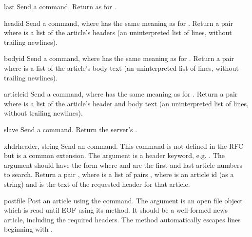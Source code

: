 \begin{funcdesc}{last}{}
Send a  command.  Return as for .
\end{funcdesc}

\begin{funcdesc}{head}{id}
Send a  command, where  has the same meaning as for
.  Return a pair 
where  is a list of the article's headers (an uninterpreted
list of lines, without trailing newlines).
\end{funcdesc}

\begin{funcdesc}{body}{id}
Send a  command, where  has the same meaning as for
.  Return a pair 
where  is a list of the article's body text (an
uninterpreted list of lines, without trailing newlines).
\end{funcdesc}

\begin{funcdesc}{article}{id}
Send a  command, where  has the same meaning as
for .  Return a pair 
where  is a list of the article's header and body text (an
uninterpreted list of lines, without trailing newlines).
\end{funcdesc}

\begin{funcdesc}{slave}{}
Send a  command.  Return the server's .
\end{funcdesc}

\begin{funcdesc}{xhdr}{header, string}
Send an  command.  This command is not defined in the RFC
but is a common extension.  The  argument is a header
keyword, e.g. .  The  argument should have
the form  where  and
 are the first and last article numbers to search.  Return a
pair , where  is a list of
pairs , where  is an article id
(as a string) and  is the text of the requested header for
that article.
\end{funcdesc}

\begin{funcdesc}{post}{file}
Post an article using the  command.  The 
argument is an open file object which is read until EOF using its
 method.  It should be a well-formed news article,
including the required headers.  The  method
automatically escapes lines beginning with .
\end{funcdesc}

